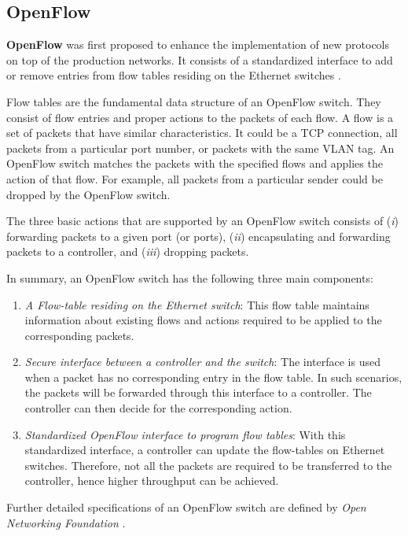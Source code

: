     
\subsection{OpenFlow}
\label{OpenFlow}
\textbf{OpenFlow} was first proposed to enhance the implementation of new protocols on top 
of the production networks. It consists of a standardized interface to add or remove entries 
from flow tables residing on the Ethernet switches \cite{mckeown2008openflow}.

Flow tables are the fundamental data structure of an OpenFlow switch. They consist of flow 
entries and proper actions to the packets of each flow. A flow is a set of packets that have 
similar characteristics. It could be a TCP connection, all packets from a particular port 
number, or packets with the same VLAN tag. An OpenFlow switch matches the packets with the 
specified flows and applies the action of that flow. For example, all packets from a 
particular sender could be dropped by the OpenFlow switch. 

The three basic actions that are supported by an OpenFlow switch consists of (\emph{i}) 
forwarding packets to a given port (or ports), (\emph{ii}) encapsulating and forwarding 
packets to a controller, and (\emph{iii}) dropping packets.


In summary, an OpenFlow switch has the following three main components:
\begin{enumerate}
    \item \emph{A Flow-table residing on the Ethernet switch}: This flow table maintains 
    information about existing flows and actions required to be applied to the corresponding 
    packets.
    \item \emph{Secure interface between a controller and the switch}: The interface is used 
    when a packet has no corresponding entry in the flow table. In such scenarios, the packets 
    will be forwarded through this interface to a controller. The controller can then decide 
    for the corresponding action.
    \item \emph{Standardized OpenFlow interface to program flow tables}: With this standardized
    interface, a controller can update the flow-tables on Ethernet switches. Therefore, not 
    all the packets are required to be transferred to the controller, hence higher throughput 
    can be achieved. 
\end{enumerate}

Further detailed specifications of an OpenFlow switch are defined by 
\emph{Open Networking Foundation} \cite{specification2009version}. 

